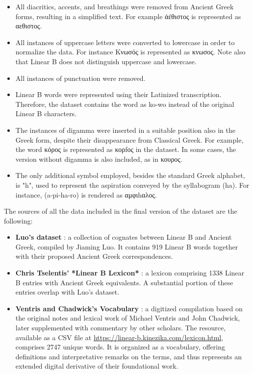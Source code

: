 \begin{itemize}
    \item All diacritics, accents, and breathings were removed from Ancient Greek forms, resulting in a simplified text. For example \textgreek{ἀέθιστος} is represented as \textgreek{αεθιστος}.

    \item All instances of uppercase letters were converted to lowercase in order to normalize the data. For instance \textgreek{Κνωσός} is represented as \textgreek{κνωσος}.
    Note also that Linear B does not distinguish uppercase and lowercase.
    
    \item All instances of punctuation were removed.
    
    \item Linear B words were represented using their Latinized transcription.  
    Therefore, the dataset contains the word \textlinb{\Bko\Bwo} as ko-wo instead of the original Linear B characters.

    \item The instances of digamma were inserted in a suitable position also in the Greek form, despite their disappearance from Classical Greek.  
    For example, the word \textgreek{κόρος} is represented as \textgreek{κορfος} in the dataset.
    In some cases, the version without digamma is also included, as in \textgreek{κουρος}.

    \item The only additional symbol employed, besides the standard Greek alphabet, is "h", used to represent the aspiration conveyed by the syllabogram \textlinb{\Baii} (ha).
    For instance, \textlinb{\Ba\Bpi\Baii\Bro} (a-pi-ha-ro) is rendered as \textgreek{αμφιhαλος}.
\end{itemize}

The sources of all the data included in the final version of the dataset are the following:

\begin{itemize}
\item \textbf{Luo's dataset} \cite{luo}: a collection of cognates between Linear B and Ancient Greek, compiled by Jiaming Luo. It contains 919 Linear B words together with their proposed Ancient Greek correspondences.
\item \textbf{Chris Tselentis' *Linear B Lexicon*} \cite{tselentis}: a lexicon comprising 1338 Linear B entries with Ancient Greek equivalents. A substantial portion of these entries overlap with Luo's dataset.
\item \textbf{Ventris and Chadwick's Vocabulary} \cite{chadwick-notes}: a digitized compilation based on the original notes and lexical work of Michael Ventris and John Chadwick, later supplemented with commentary by other scholars. The resource, available as a CSV file at \url{https://linear-b.kinezika.com/lexicon.html}, comprises 2747 unique words.
It is organized as a vocabulary, offering definitions and interpretative remarks on the terms, and thus represents an extended digital derivative of their foundational work.
\end{itemize}


